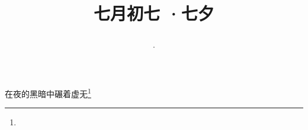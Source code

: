 \title{\date[d=10,m=8,y=2024][year:cn-y,年,month:cn,day:cn,日,·,weekday]·七月初七 ·七夕}
在夜的黑暗中碾着虚无\footnote{ }

